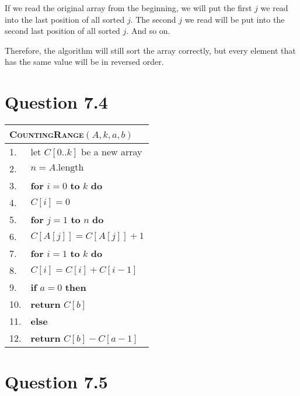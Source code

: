 \documentclass[a4paper,12pt]{article}
\begin{document}
If we read the original array from the beginning, we will put the first $j$ we read into the last position of all sorted $j$.
The second $j$ we read will be put into the second last position of all sorted $j$.
And so on.

Therefore, the algorithm will still sort the array correctly, but every element that has the same value will be in reversed order.

\section*{Question 7.4}

\begin{center}
	\begin{tabular}{ll}
		\toprule
		\multicolumn{2}{l}{\textsc{CountingRange}$(A,k,a,b)$} \\
		\midrule
		1. & let $C[0..k]$ be a new array \\
		2. & $n = A.\text{length}$ \\
		3. & \textbf{for} $i = 0$ \textbf{to} $k$ \textbf{do} \\
		4. & \qquad $C[i] = 0$ \\
		5. & \textbf{for} $j = 1$ \textbf{to} $n$ \textbf{do} \\
		6. & \qquad $C[A[j]] = C[A[j]] + 1$ \\
		7. & \textbf{for} $i = 1$ \textbf{to} $k$ \textbf{do} \\
		8. & \qquad $C[i] = C[i] + C[i-1]$ \\
		9. & \textbf{if} $a = 0$ \textbf{then} \\
		10. & \qquad \textbf{return} $C[b]$ \\
		11. & \textbf{else} \\
		12. & \qquad \textbf{return} $C[b] - C[a-1]$ \\
		\bottomrule
	\end{tabular}
\end{center}

\section*{Question 7.5}
\end{document}
